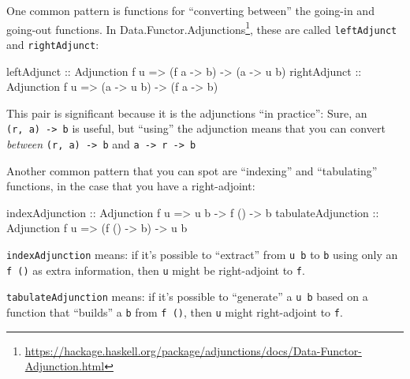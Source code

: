 \documentclass[]{article}
\newenvironment{Shaded}{}{}
\newcommand{\DataTypeTok}[1]{\textcolor[rgb]{0.56,0.13,0.00}{#1}}
\newcommand{\NormalTok}[1]{#1}
\newcommand{\OtherTok}[1]{\textcolor[rgb]{0.00,0.44,0.13}{#1}}
\renewcommand{\href}[2]{#2\footnote{\url{#1}}}
\begin{document}
One common pattern is functions for ``converting between'' the going-in and
going-out functions. In
\href{https://hackage.haskell.org/package/adjunctions/docs/Data-Functor-Adjunction.html}{Data.Functor.Adjunctions},
these are called \texttt{leftAdjunct} and \texttt{rightAdjunct}:

\begin{Shaded}
\begin{Highlighting}[]
\OtherTok{leftAdjunct  ::} \DataTypeTok{Adjunction}\NormalTok{ f u }\OtherTok{=\textgreater{}}\NormalTok{ (f a }\OtherTok{{-}\textgreater{}}\NormalTok{ b) }\OtherTok{{-}\textgreater{}}\NormalTok{ (a }\OtherTok{{-}\textgreater{}}\NormalTok{ u b)}
\OtherTok{rightAdjunct ::} \DataTypeTok{Adjunction}\NormalTok{ f u }\OtherTok{=\textgreater{}}\NormalTok{ (a }\OtherTok{{-}\textgreater{}}\NormalTok{ u b) }\OtherTok{{-}\textgreater{}}\NormalTok{ (f a }\OtherTok{{-}\textgreater{}}\NormalTok{ b)}
\end{Highlighting}
\end{Shaded}

This pair is significant because it is the adjunctions ``in practice'': Sure, an
\texttt{(r,\ a)\ -\textgreater{}\ b} is useful, but ``using'' the adjunction
means that you can convert \emph{between} \texttt{(r,\ a)\ -\textgreater{}\ b}
and \texttt{a\ -\textgreater{}\ r\ -\textgreater{}\ b}

Another common pattern that you can spot are ``indexing'' and ``tabulating''
functions, in the case that you have a right-adjoint:

\begin{Shaded}
\begin{Highlighting}[]
\OtherTok{indexAdjunction    ::} \DataTypeTok{Adjunction}\NormalTok{ f u }\OtherTok{=\textgreater{}}\NormalTok{ u b }\OtherTok{{-}\textgreater{}}\NormalTok{ f () }\OtherTok{{-}\textgreater{}}\NormalTok{ b}
\OtherTok{tabulateAdjunction ::} \DataTypeTok{Adjunction}\NormalTok{ f u }\OtherTok{=\textgreater{}}\NormalTok{ (f () }\OtherTok{{-}\textgreater{}}\NormalTok{ b) }\OtherTok{{-}\textgreater{}}\NormalTok{ u b}
\end{Highlighting}
\end{Shaded}

\texttt{indexAdjunction} means: if it's possible to ``extract'' from
\texttt{u\ b} to \texttt{b} using only an \texttt{f\ ()} as extra information,
then \texttt{u} might be right-adjoint to \texttt{f}.

\texttt{tabulateAdjunction} means: if it's possible to ``generate'' a
\texttt{u\ b} based on a function that ``builds'' a \texttt{b} from
\texttt{f\ ()}, then \texttt{u} might right-adjoint to \texttt{f}.
\end{document}
